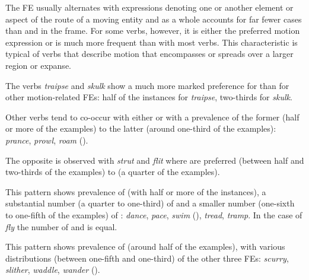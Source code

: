 \documentclass[output=paper,colorlinks,citecolor=brown]{langscibook}
\begin{document}
The FE  usually alternates with expressions denoting one or another element or aspect of the route of a moving entity and as a whole accounts for far fewer cases than  and  in the frame. For some verbs, however, it is either the preferred motion expression or is much more frequent than with most verbs. This characteristic is typical of verbs that describe motion that encompasses or spreads over a larger region or expanse.

\begin{description}[font=\normalfont]
\item[\fename{Area}:] The verbs \textit{traipse} and \textit{skulk} show a much more marked preference for  than for other motion-related FEs: half of the instances for \textit{traipse}, two-thirds for \textit{skulk}.

\item[\fename{Area} or \fename{Path}:] Other verbs tend to co-occur with either  or  with a prevalence of the former (half or more of the examples) to the latter (around one-third of the examples): \textit{prance}, \textit{prowl}, \textit{roam} ().

\item[\fename{Path} or \fename{Area}:] The opposite is observed with \textit{strut} and \textit{flit} where  are preferred (between half and two-thirds of the examples) to  (a quarter of the examples).
											
\item[\fename{Path}, \fename{Area} or \fename{Goal}:] This pattern shows prevalence of  (with half or more of the instances), a substantial number (a quarter to one-third) of  and a smaller number (one-sixth to one-fifth of the examples) of : \textit{dance}, \textit{pace}, \textit{swim} (), \textit{tread}, \textit{tramp}. In the case of \textit{fly} the number of  and  is equal.

            
\item[\fename{Path}, \fename{Goal}, \fename{Area} or \fename{Source}:] This pattern shows prevalence of  (ar\-ound half of the examples), with various distributions (between one-fifth and one-third) of the other three FEs: \textit{scurry}, \textit{slither}, \textit{waddle}, \textit{wander} ().
\end{description}
\end{document}

